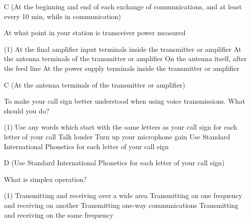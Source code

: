 \documentclass[a4paper]{article}
\begin{document}
\begin{solution}
	C (At the beginning and end of each exchange of communications, and at least every 10 min, while in communication)
\end{solution}

\vspace{5mm}



\begin{question}At what point in your station is transceiver power measured
	\begin{tasks}(1)
		\task At the final amplifier input terminals inside the transmitter or amplifier
		\task At the antenna terminals of the transmitter or amplifier
		\task On the antenna itself, after the feed line
		\task At the power supply terminals inside the transmitter or amplifier
	\end{tasks}
\end{question}

\begin{solution}
	C (At the antenna terminals of the transmitter or amplifier)
\end{solution}

\vspace{5mm}



\begin{question}To make your call sign better understood when using voice transmissions. What should you do?
	\begin{tasks}(1)
		\task Use any words which start with the same letters as your call sign for each letter of your call
		\task Talk louder
		\task Turn up your microphone gain
		\task Use Standard International Phonetics for each letter of your call sign
	\end{tasks}
\end{question}

\begin{solution}
	D (Use Standard International Phonetics for each letter of your call sign)
\end{solution}

\vspace{5mm}



\begin{question}What is simplex operation?
	\begin{tasks}(1)
		\task Transmitting and receiving over a wide area
		\task Transmitting on one frequency and receiving on another
		\task Transmitting one-way communications
		\task Transmitting and receiving on the same frequency
	\end{tasks}
\end{question}
\end{document}
